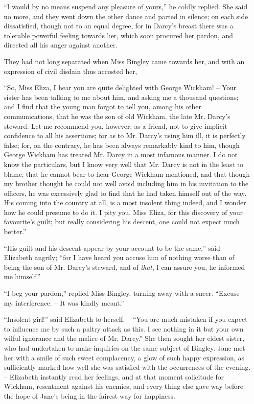 “I would by no means suspend any pleasure of yours,”
he coldly replied. She said no more, and they went down
the other dance and parted in silence; on each side
dissatisfied, though not to an equal degree, for in Darcy’s
breast there was a tolerable powerful feeling towards her,
which soon procured her pardon, and directed all his anger
against another.

They had not long separated when Miss Bingley came
towards her, and with an expression of civil disdain thus
accosted her,

“So, Miss Eliza, I hear you are quite delighted with
George Wickham! -- Your sister has been talking to me
about him, and asking me a thousand questions; and
I find that the young man forgot to tell you, among his
other communications, that he was the son of old Wickham,
the late Mr. Darcy’s steward. Let me recommend you,
however, as a friend, not to give implicit confidence to all
his assertions; for as to Mr. Darcy’s using him ill, it is
perfectly false; for, on the contrary, he has been always
remarkably kind to him, though George Wickham has
treated Mr. Darcy in a most infamous manner. I do not
know the particulars, but I know very well that Mr. Darcy
is not in the least to blame, that he cannot bear to hear
George Wickham mentioned, and that though my brother
thought he could not well avoid including him in his
invitation to the officers, he was excessively glad to find
that he had taken himself out of the way. His coming
into the country at all, is a most insolent thing indeed,
and I wonder how he could presume to do it. I pity you,
Miss Eliza, for this discovery of your favourite’s guilt;
but really considering his descent, one could not expect
much better.”

“His guilt and his descent appear by your account to
be the same,” said Elizabeth angrily; “for I have heard
you accuse him of nothing worse than of being the son
of Mr. Darcy’s steward, and of \textit{that}, I can assure you, he
informed me himself.”

“I beg your pardon,” replied Miss Bingley, turning
away with a sneer. “Excuse my interference. -- It was
kindly meant.”

“Insolent girl!” said Elizabeth to herself. -- “You are
much mistaken if you expect to influence me by such
a paltry attack as this. I see nothing in it but your own
wilful ignorance and the malice of Mr. Darcy.” She then
sought her eldest sister, who had undertaken to make
inquiries on the same subject of Bingley. Jane met her
with a smile of such sweet complacency, a glow of such
happy expression, as sufficiently marked how well she was
satisfied with the occurrences of the evening. -- Elizabeth
instantly read her feelings, and at that moment solicitude
for Wickham, resentment against his enemies, and every
thing else gave way before the hope of Jane’s being in the
fairest way for happiness.

